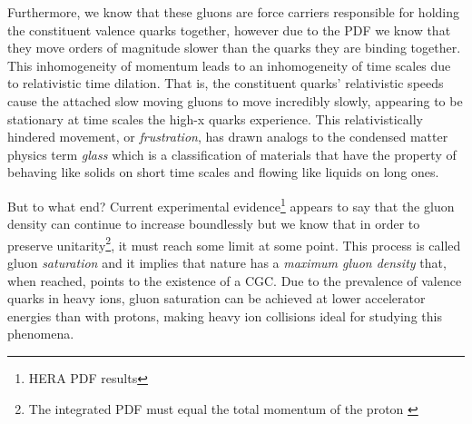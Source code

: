 Furthermore, we know that these gluons are force carriers responsible for holding the constituent valence quarks together, however due to the PDF we know that they move orders of magnitude slower than the quarks they are binding together. This inhomogeneity of momentum leads to an inhomogeneity of time scales due to relativistic time dilation. That is, the constituent quarks' relativistic speeds cause the attached slow moving gluons to move incredibly slowly, appearing to be stationary at time scales the high-x quarks experience. This relativistically hindered movement, or \textit{frustration}, has drawn analogs to the condensed matter physics term \textit{glass} which is a classification of materials that have the property of behaving like solids on short time scales and flowing like liquids on long ones. 

But to what end? Current experimental evidence\footnote{HERA PDF results} appears to say that the gluon density can continue to increase boundlessly but we know that in order to preserve unitarity\footnote{The integrated PDF must equal the total momentum of the proton \citep{HemmickRHIClecture}}, it must reach some limit at some point. This process is called gluon \textit{saturation} and it implies that nature has a \textit{maximum gluon density} that, when reached, points to the existence of a CGC\citep{HemmickRHIClecture}. Due to the prevalence of valence quarks in heavy ions, gluon saturation can be achieved at lower accelerator energies than with protons, making heavy ion collisions ideal for studying this phenomena.

